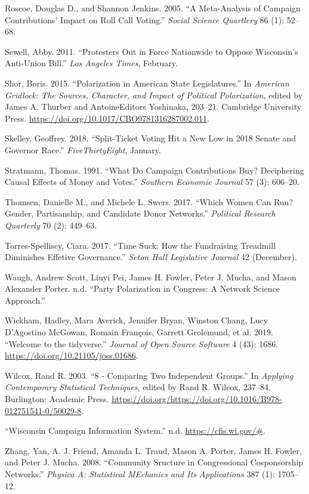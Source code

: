 \documentclass[12pt,]{article}
\begin{document}
\leavevmode\hypertarget{ref-roscoe2005}{}%
Roscoe, Douglas D., and Shannon Jenkins. 2005. ``A Meta-Analysis of
Campaign Contributions' Impact on Roll Call Voting.'' \emph{Social
Science Quartlery} 86 (1): 52--68.

\leavevmode\hypertarget{ref-sewell2011}{}%
Sewell, Abby. 2011. ``Protesters Out in Force Nationwide to Oppose
Wisconsin's Anti-Union Bill.'' \emph{Los Angeles Times}, February.

\leavevmode\hypertarget{ref-shor2015}{}%
Shor, Boris. 2015. ``Polarization in American State Legislatures.'' In
\emph{American Gridlock: The Sources, Character, and Impact of Political
Polarization}, edited by James A. Thurber and AntoineEditors Yoshinaka,
203--21. Cambridge University Press.
\url{https://doi.org/10.1017/CBO9781316287002.011}.

\leavevmode\hypertarget{ref-skelley2018}{}%
Skelley, Geoffrey. 2018. ``Split-Ticket Voting Hit a New Low in 2018
Senate and Governor Race.'' \emph{FiveThirtyEight}, January.

\leavevmode\hypertarget{ref-stratmann1991}{}%
Stratmann, Thomas. 1991. ``What Do Campaign Contributions Buy?
Deciphering Causal Effects of Money and Votes.'' \emph{Southern Economic
Journal} 57 (3): 606--20.

\leavevmode\hypertarget{ref-thomsen2017}{}%
Thomsen, Danielle M., and Michele L. Swers. 2017. ``Which Women Can Run?
Gender, Partisanship, and Candidate Donor Networks.'' \emph{Political
Research Quarterly} 70 (2): 449--63.

\leavevmode\hypertarget{ref-torres-spelliscy2017}{}%
Torres-Spelliscy, Ciara. 2017. ``Time Suck: How the Fundraising
Treadmill Diminishes Effetive Governance.'' \emph{Seton Hall Legislative
Journal} 42 (December).

\leavevmode\hypertarget{ref-waugh2009}{}%
Waugh, Andrew Scott, Liuyi Pei, James H. Fowler, Peter J. Mucha, and
Mason Alexander Porter. n.d. ``Party Polarization in Congress: A Network
Science Approach.''

\leavevmode\hypertarget{ref-tidyverse}{}%
Wickham, Hadley, Mara Averick, Jennifer Bryan, Winston Chang, Lucy
D'Agostino McGowan, Romain François, Garrett Grolemund, et al. 2019.
``Welcome to the tidyverse.'' \emph{Journal of Open Source Software} 4
(43): 1686. \url{https://doi.org/10.21105/joss.01686}.

\leavevmode\hypertarget{ref-wilcox2003}{}%
Wilcox, Rand R. 2003. ``8 - Comparing Two Independent Groups.'' In
\emph{Applying Contemporary Statistical Techniques}, edited by Rand R.
Wilcox, 237--84. Burlington: Academic Press.
\url{https://doi.org/https://doi.org/10.1016/B978-012751541-0/50029-8}.

\leavevmode\hypertarget{ref-cfis}{}%
``Wisconsin Campaign Information System.'' n.d.
\url{https://cfis.wi.gov/\#}.

\leavevmode\hypertarget{ref-zhang2008}{}%
Zhang, Yan, A. J. Friend, Amanda L. Traud, Mason A. Porter, James H.
Fowler, and Peter J. Mucha. 2008. ``Community Sructure in Congressional
Cosponsorship Networks.'' \emph{Physica A: Statistical MEchanics and Its
Applications} 387 (1): 1705--12.





\newpage
\singlespacing 
\end{document}
